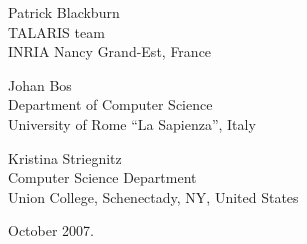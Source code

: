 \begin{flushright}
Patrick Blackburn\\
TALARIS team\\
INRIA Nancy Grand-Est, France\\\bigskip

Johan Bos\\
Department of Computer Science\\
University of Rome ``La Sapienza'', Italy\\\bigskip

Kristina Striegnitz\\
Computer Science Department\\
Union College, Schenectady, NY, United States\\\bigskip

October 2007.
\end{flushright}
